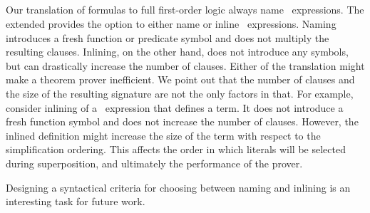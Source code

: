 \subsection{\LETIN}
Our translation of \folb{} formulas to full first-order logic always name \LETIN\ expressions. The extended \newcnf{} provides the option to either name or inline \LETIN\ expressions. Naming introduces a fresh function or predicate symbol and does not multiply the resulting clauses. Inlining, on the other hand, does not introduce any symbols, but can drastically increase the number of clauses. Either of the translation might make a theorem prover inefficient. We point out that the number of clauses and the size of the resulting signature are not the only factors in that. For example, consider inlining of a \LETIN\ expression that defines a term. It does not introduce a fresh function symbol and does not increase the number of clauses. However, the inlined definition might increase the size of the term with respect to the simplification ordering. This affects the order in which literals will be selected during superposition, and ultimately the performance of the prover.

Designing a syntactical criteria for choosing between naming and inlining is an interesting task for future work.



